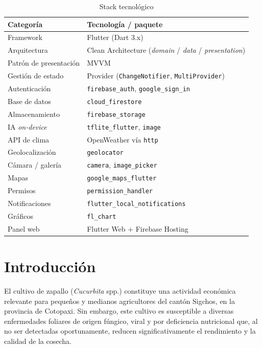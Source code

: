 \documentclass[12pt,a4paper]{article}
\begin{document}
\begin{table}[H]
\centering
\caption{Stack tecnológico}
\label{tab:stack}
\renewcommand{\arraystretch}{1.25}
\begin{tabular}{p{4.3cm} p{9.2cm}}
\toprule
\bfseries Categoría & \bfseries Tecnología / paquete \\
\midrule
Framework & Flutter (Dart 3.x) \\
Arquitectura & Clean Architecture (\textit{domain} / \textit{data} / \textit{presentation}) \\
Patrón de presentación & MVVM \\
Gestión de estado & Provider (\texttt{ChangeNotifier}, \texttt{MultiProvider}) \\
Autenticación & \texttt{firebase\_auth}, \texttt{google\_sign\_in} \\
Base de datos & \texttt{cloud\_firestore} \\
Almacenamiento & \texttt{firebase\_storage} \\
IA \textit{on-device} & \texttt{tflite\_flutter}, \texttt{image} \\
API de clima & OpenWeather vía \texttt{http} \\
Geolocalización & \texttt{geolocator} \\
Cámara / galería & \texttt{camera}, \texttt{image\_picker} \\
Mapas & \texttt{google\_maps\_flutter} \\
Permisos & \texttt{permission\_handler} \\
Notificaciones & \texttt{flutter\_local\_notifications} \\
Gráficos & \texttt{fl\_chart} \\
Panel web & Flutter Web + Firebase Hosting \\
\bottomrule
\end{tabular}
\end{table}

\section{Introducción}

El cultivo de zapallo (\textit{Cucurbita} spp.) constituye una actividad
económica relevante para pequeños y medianos agricultores del cantón Sigchos,
en la provincia de Cotopaxi. Sin embargo, este cultivo es susceptible a diversas
enfermedades foliares de origen fúngico, viral y por deficiencia nutricional
que, al no ser detectadas oportunamente, reducen significativamente el
rendimiento y la calidad de la cosecha.
\end{document}
